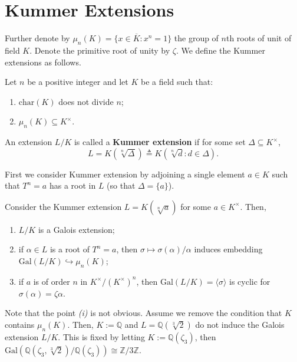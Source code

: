 \documentclass{template}
\begin{document}
\section{Kummer Extensions}

Further denote by $\mu_n(K) = \{x \in \overline{K}: x^n=1\}$ the group of $n$th
roots of unit of field $K$. Denote the primitive root of unity by $\zeta$. We
define the Kummer extensions as follows.

\begin{definition}\label{def:kummer-extension}
    Let $n$ be a positive integer and let $K$ be a field such that:
    \begin{enumerate}
        \item $\text{char}(K)$ does not divide $n$;
        \item $\mu_n(K) \subseteq K^{\times}$.
    \end{enumerate}
    An extension $L/K$ is called a \textbf{Kummer extension} if for some set
    $\Delta \subseteq K^{\times}$, 
    \begin{equation*}
        L = K(\sqrt[n]{\Delta}) \triangleq K(\sqrt[n]{d}: d \in \Delta).
    \end{equation*}
\end{definition}

First we consider Kummer extension by adjoining a single element $a \in K$ such
that $T^n=a$ has a root in $L$ (so that $\Delta = \{a\}$).

\begin{lemma}
    Consider the Kummer extension $L=K(\sqrt[n]{a})$ for some $a \in K^{\times}$. Then,
    \begin{enumerate}
        \item[(i)] $L/K$ is a Galois extension;
        \item[(ii)] if $\alpha \in L$ is a root of $T^n=a$, then 
        $\sigma \mapsto \sigma(\alpha)/\alpha$ induces 
        embedding $\text{Gal}(L/K) \hookrightarrow \mu_n(K)$;
        \item[(iii)] if $a$ is of order $n$ in $K^{\times}/(K^{\times})^n$,
        then $\text{Gal}(L/K) = \langle \sigma \rangle$ is cyclic
        for $\sigma(\alpha) = \zeta\alpha$.
    \end{enumerate}
\end{lemma}

\begin{remark}
    Note that the point \textit{(i)} is not obvious. Assume we remove the
    condition that $K$ contains $\mu_n(K)$. Then, $K := \mathbb{Q}$ and $L =
    \mathbb{Q}(\sqrt[3]{2})$ do not induce the Galois extension $L/K$. This is
    fixed by letting $K := \mathbb{Q}(\zeta_3)$, then
    $\text{Gal}(\mathbb{Q}(\zeta_3,\sqrt[3]{2})/\mathbb{Q}(\zeta_3)) \cong
    \mathbb{Z}/3\mathbb{Z}$.
\end{remark}
\end{document}

